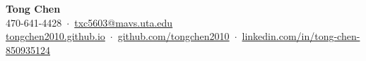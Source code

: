 \begin{center}
  {\LARGE\textbf{Tong Chen}}\\[5pt]
  470-641-4428 \,$\cdot$\, \href{mailto:txc5603@mavs.uta.edu}{txc5603@mavs.uta.edu}\\[2pt]
  \href{https://tongchen2010.github.io}{tongchen2010.github.io} \,$\cdot$\,
  \href{https://github.com/tongchen2010}{github.com/tongchen2010} \,$\cdot$\,
  \href{https://www.linkedin.com/in/tong-chen-850935124}{linkedin.com/in/tong-chen-850935124}
\end{center}
